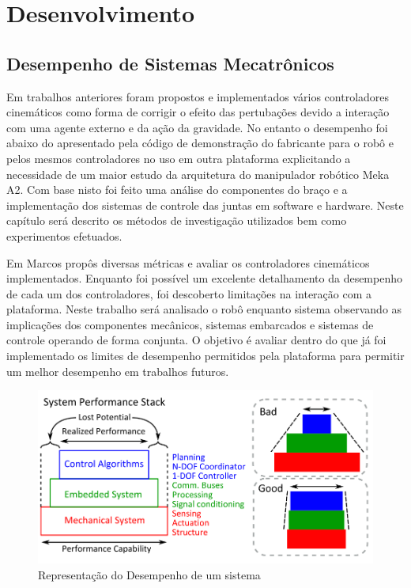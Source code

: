 \chapter{Desenvolvimento\label{ch:develop}}


\section{Desempenho de Sistemas Mecatrônicos}

Em trabalhos anteriores foram propostos e implementados vários controladores cinemáticos como forma de corrigir o efeito das pertubações devido a interação com uma agente externo e da ação da gravidade. No entanto o desempenho foi abaixo do apresentado pela código de demonstração do fabricante para o robô e pelos mesmos controladores no uso em outra plataforma explicitando a necessidade de um maior estudo da arquitetura do manipulador robótico Meka A2. Com base nisto foi feito uma análise do componentes do braço e a implementação dos sistemas de controle das juntas em software e hardware. Neste capítulo será descrito os métodos de investigação utilizados bem como experimentos efetuados.

Em \cite{marcosps2016} Marcos propôs diversas métricas e avaliar os controladores cinemáticos implementados. Enquanto foi possível um excelente detalhamento da desempenho de cada um dos controladores, foi descoberto limitações na interação com a plataforma. Neste trabalho será analisado o robô enquanto sistema observando as implicações dos componentes mecânicos, sistemas embarcados e sistemas de controle operando de forma conjunta. O objetivo é avaliar dentro do que já foi implementado os limites de desempenho permitidos pela plataforma para permitir um melhor desempenho em trabalhos futuros.

\begin{figure}[H]
    \centering
    \includegraphics[width = 0.9\linewidth]{tex/figs/system_perfomance.png}
    \caption{Representação do Desempenho de um sistema \cite{paine2014high}}
    \label{fig:system_perfomance}
\end{figure}


